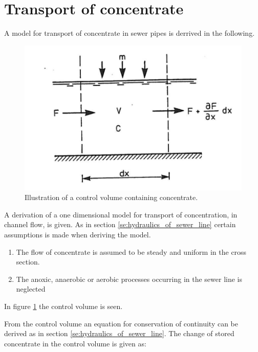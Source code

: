 \section{Transport of concentrate}\label{se:transport_of_concentrate}

A model for transport of concentrate in sewer pipes is derrived in the following.

\begin{figure}[H]
\centering
\includegraphics[width=.6\textwidth]{report/modeling/pictures/poopvolume.png}
\caption{Illustration of a control volume containing concentrate.}
\label{fig:poopvolume}
\end{figure} 

 A derivation of a one dimensional model for transport of concentration, in channel flow, is given. 
 As in section \ref{se:hydraulics_of_sewer_line} certain assumptions is made when deriving the model.

 \begin{table}[H]
\begin{enumerate}
	\item The flow of concentrate is assumed to be steady and uniform in the cross section.
	\item The anoxic, anaerobic or aerobic processes occurring in the sewer line is neglected   
\end{enumerate}
\label{tab:concentrate_flow}
\end{table}
 In figure \ref{fig:poopvolume} the control volume is seen. 



From the control volume an equation for conservation of continuity can be derived as in section \ref{se:hydraulics_of_sewer_line}. The change of stored concentrate in the control volume is given as:

